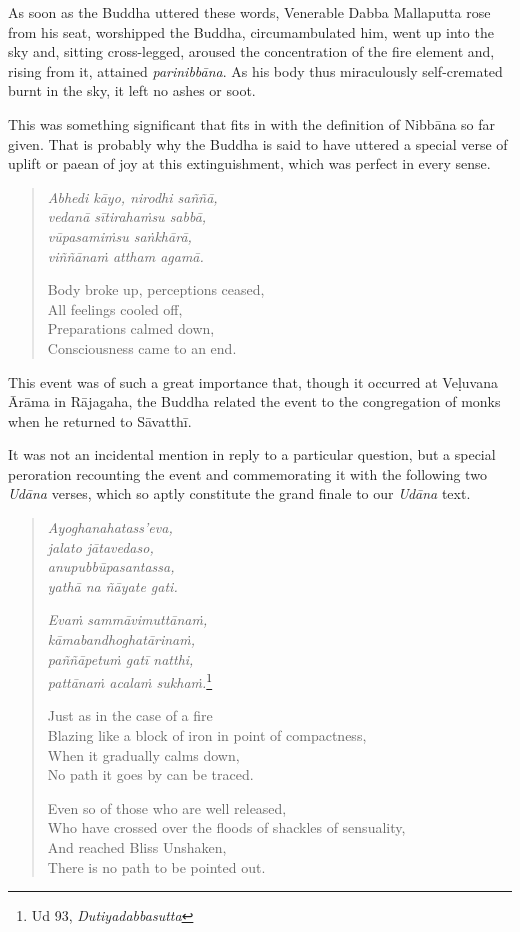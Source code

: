 As soon as the Buddha uttered these words, Venerable Dabba Mallaputta rose from his seat, worshipped the Buddha, circumambulated him, went up into the sky and, sitting cross-legged, aroused the concentration of the fire element and, rising from it, attained \emph{parinibbāna}. As his body thus miraculously self-cremated burnt in the sky, it left no ashes or soot.

This was something significant that fits in with the definition of Nibbāna so far given. That is probably why the Buddha is said to have uttered a special verse of uplift or paean of joy at this extinguishment, which was perfect in every sense.

\begin{quote}
\emph{Abhedi kāyo, nirodhi saññā,}\\
\emph{vedanā sītirahaṁsu sabbā,}\\
\emph{vūpasamiṁsu saṅkhārā,}\\
\emph{viññānaṁ attham agamā.}

Body broke up, perceptions ceased,\\
All feelings cooled off,\\
Preparations calmed down,\\
Consciousness came to an end.
\end{quote}

This event was of such a great importance that, though it occurred at Veḷuvana Ārāma in Rājagaha, the Buddha related the event to the congregation of monks when he returned to Sāvatthī.

It was not an incidental mention in reply to a particular question, but a special peroration recounting the event and commemorating it with the following two \emph{Udāna} verses, which so aptly constitute the grand finale to our \emph{Udāna} text.

\begin{quote}
\emph{Ayoghanahatass'eva,}\\
\emph{jalato jātavedaso,}\\
\emph{anupubbūpasantassa,}\\
\emph{yathā na ñāyate gati.}

\emph{Evaṁ sammāvimuttānaṁ,}\\
\emph{kāmabandhoghatārinaṁ,}\\
\emph{paññāpetuṁ gatī natthi,}\\
\emph{pattānaṁ acalaṁ sukhaṁ.}\footnote{Ud 93, \emph{Dutiyadabbasutta}}

Just as in the case of a fire\\
Blazing like a block of iron in point of compactness,\\
When it gradually calms down,\\
No path it goes by can be traced.

Even so of those who are well released,\\
Who have crossed over the floods of shackles of sensuality,\\
And reached Bliss Unshaken,\\
There is no path to be pointed out.
\end{quote}

